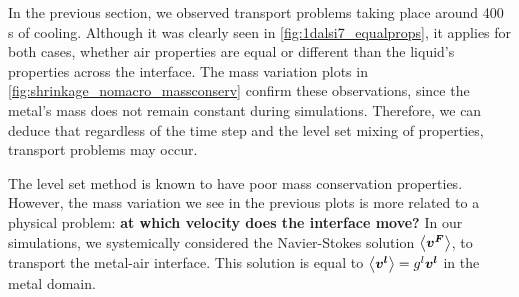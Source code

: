 
In the previous section, we observed transport problems taking place around 400 s of cooling. Although it was clearly seen in \cref{fig:1dalsi7_equalprops}, it applies
for both cases, whether air properties are equal or different than the liquid's properties across the interface. 
The mass variation plots in \cref{fig:shrinkage_nomacro_massconserv} confirm these observations, since the metal's mass does not remain 
constant during simulations.
Therefore, we can deduce that regardless of the time step and the level set mixing of properties, 
transport problems may occur. 

The level set method is known to have poor mass conservation properties. However, the mass variation
we see in the previous plots is more related to a physical problem: \textbf{at which velocity does the interface move?}
In our simulations, we systemically considered the Navier-Stokes solution $\left \langle \boldsymbol{v^F} \right \rangle$,
to transport the metal-air interface. This solution is equal to $\left \langle \boldsymbol{v^l} \right \rangle= {g^l} \boldsymbol{v^l}$ in the metal domain. 


